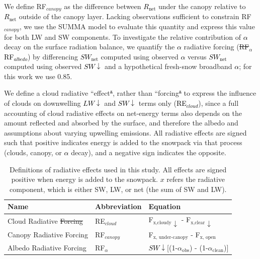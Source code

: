 \documentclass[draft]{agujournal2019}
\newcommand{\lwdn}{\textcolor{black}{$LW\downarrow$}\xspace}
\newcommand{\rnet}{\textcolor{black}{$R_{\mathrm{net}}$}\xspace}
\newcommand{\swnet}{\textcolor{black}{$SW_{\mathrm{net}}$}\xspace}
\newcommand{\swdn}{\textcolor{black}{$SW\downarrow$}\xspace}
\newcommand{\albedo}{\textcolor{black}{$\alpha$}\xspace}
\newcommand{\rfalb}{\textcolor{black}{RF$_{albedo}$}\xspace}
\newcommand{\rfcirrus}{\textcolor{black}{RE$_{cloud}$}\xspace}
\providecommand{\DIFadd}[1]{{\protect\color{blue}\uwave{#1}}} %
\providecommand{\DIFdel}[1]{{\protect\color{red}\sout{#1}}}                      %
\providecommand{\DIFaddbegin}{} %
\providecommand{\DIFaddend}{} %
\providecommand{\DIFdelbegin}{} %
\providecommand{\DIFdelend}{} %
\providecommand{\DIFaddFL}[1]{\DIFadd{#1}} %
\providecommand{\DIFdelFL}[1]{\DIFdel{#1}} %
\providecommand{\DIFaddbeginFL}{} %
\providecommand{\DIFaddendFL}{} %
\providecommand{\DIFdelbeginFL}{} %
\providecommand{\DIFdelendFL}{} %
\begin{document}
We define RF$_{canopy}$ as the difference between \rnet under the canopy relative to \rnet outside of the canopy layer.
Lacking observations sufficient to constrain RF$_{canopy}$, we use the SUMMA model to evaluate this quantity and express this value for both LW and SW components.
To investigate the relative contribution of \albedo decay on the surface radiation balance, we quantify the \albedo radiative forcing (\DIFdelbegin \DIFdel{RF$_{\alpha}$}\DIFdelend \DIFaddbegin \rfalb\DIFaddend ) by differencing \swnet computed using observed \albedo versus \swnet computed using observed \swdn and a hypothetical fresh-snow broadband \albedo; for this work we use 0.85.

We define a cloud radiative ``effect\DIFdelbegin \DIFdel{"}\DIFdelend \DIFaddbegin \DIFadd{''}\DIFaddend , rather than ``forcing\DIFdelbegin \DIFdel{" }\DIFdelend \DIFaddbegin \DIFadd{'' }\DIFaddend to express the influence of clouds on downwelling \lwdn and \swdn terms only (\rfcirrus), since a full accounting of cloud radiative effects on net-energy terms also depends on the amount reflected and absorbed by the surface, and therefore the albedo \cite{Rudisill2025-cx} and assumptions about varying upwelling emissions.
All radiative effects are signed such that positive indicates energy is added to the snowpack via that process (clouds, canopy, or \albedo decay), and a negative sign indicates the opposite.

\begin{table}[h]
\centering
\caption{Definitions of radiative effects used in this study.
All effects are signed positive when energy is added to the snowpack.
$x$ refers \DIFaddbeginFL \DIFaddFL{to }\DIFaddendFL the radiative component, which is either SW, LW, or net (the sum of SW and LW).}
\label{tab:radiative_effects}
\begin{tabular}{lll}
\hline
\textbf{Name} & \textbf{Abbreviation} & \textbf{Equation} \\
\hline
Cloud Radiative \DIFdelbeginFL \DIFdelFL{Forcing         }\DIFdelendFL \DIFaddbeginFL \DIFaddFL{Effect          }\DIFaddendFL & RE$_{cloud}$      & F$_\text{x,cloudy}\downarrow$    - F$_\text{x,clear}\downarrow$ \\
Canopy Radiative Forcing        & RF$_{canopy}$     & F$_\text{x, under-canopy}$   - F$_\text{x, open}$ \\
Albedo Radiative Forcing        & RF\DIFdelbeginFL \DIFdelFL{$_{\alpha}$     }\DIFdelendFL \DIFaddbeginFL \DIFaddFL{$_{albedo}$     }\DIFaddendFL & \swdn[(1-$\alpha_\text{obs}$)  - (1-$\alpha_\text{clean}$)]\\
\hline
\end{tabular}
\end{table}
\end{document}
